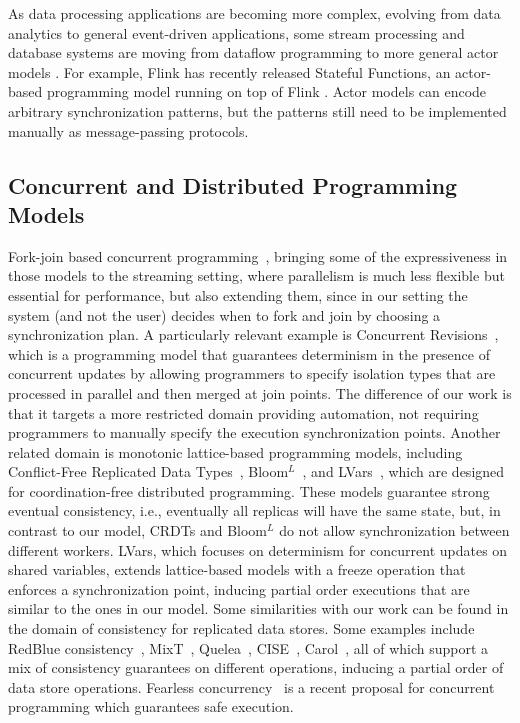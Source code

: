 As data processing applications are becoming more complex, evolving from
data analytics to general event-driven applications, some stream
processing and database systems are moving from dataflow programming to more
general actor models
\cite{CarboneFKK20,Bernstein19,BernsteinDKM17,Das2018,xu2021move}.
For example, Flink has recently released Stateful Functions,
an actor-based programming model running on top of Flink
\cite{AkhterFK19,StatefulFunctions}.
Actor models can encode arbitrary synchronization patterns,
but the patterns still need to be implemented manually as
message-passing protocols.

\subsection{Concurrent and Distributed Programming Models}

Fork-join based
concurrent programming~\cite{frigo1998implementation,lea2000java},
bringing some of the expressiveness in those models to the streaming setting,
where parallelism is much less flexible but essential for performance,
but also extending them, since in our setting the system (and not the user) decides when to fork and join by choosing a synchronization plan.
A particularly relevant example is
Concurrent Revisions~\cite{burckhardt2010concurrent},
which is a programming model that guarantees determinism in the presence of concurrent updates by allowing programmers to specify isolation types that are processed in parallel and then merged at join points.
The difference of our work is that it targets a more restricted domain providing automation,
not requiring programmers to manually specify the execution synchronization points.
Another related domain is monotonic lattice-based programming models,
including
Conflict-Free Replicated Data Types~\cite{shapiro2011conflict},
Bloom$^L$~\cite{conway12},
and LVars~\cite{lvars13,lvars14},
which are designed for coordination-free distributed programming.
These models guarantee strong eventual consistency,
i.e., eventually all replicas will have the same state,
but, in contrast to our model, CRDTs and Bloom$^L$
do not allow synchronization between different workers.
LVars, which focuses on determinism for concurrent updates on shared variables,
extends lattice-based models with a freeze operation that enforces a synchronization point,
inducing partial order executions that are similar to the ones in our model.
Some similarities with our work can be found in the domain of consistency for replicated data stores.
Some examples include RedBlue consistency~\cite{li2012making},
MixT~\cite{milano2018mixt},
Quelea~\cite{sivaramakrishnan2015declarative},
CISE~\cite{gotsman16},
Carol~\cite{lewchenko2019sequential},
all of which support a mix of consistency guarantees on different operations,
inducing a partial order of data store operations.
Fearless concurrency~\cite{milano2022flexible} is a recent proposal for concurrent programming which guarantees safe execution.

